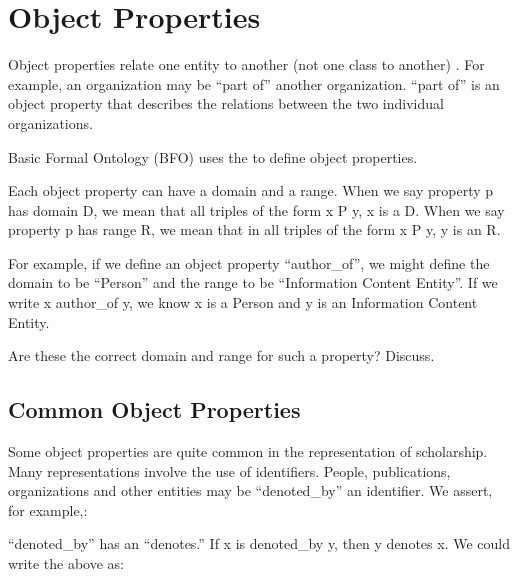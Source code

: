 \documentclass[letterpaper,10pt,english]{sphinxmanual}
\begin{document}
\chapter{Object Properties}
\label{\detokenize{object-properties:object-properties}}\label{\detokenize{object-properties::doc}}
\sphinxAtStartPar
Object properties relate one entity to another (not one class to another) .
For example, an organization may be
“part of” another organization.  “part of” is an object property that describes the
relations between the two individual organizations.

\sphinxAtStartPar
Basic Formal Ontology (BFO) uses the
 to define object
properties.

\sphinxAtStartPar
Each object property can have a domain and a range.  When we say property p has domain D,
we mean that all triples of the form x P y, x is a D.  When we say property p has range R,
we mean that in all triples of the form x P y, y is an R.

\sphinxAtStartPar
For example, if we define an object property “author\_of”, we might define the domain to
be “Person” and the range to be “Information Content Entity”. If we write x author\_of y,
we know x is a Person and y is an Information Content Entity. %
\begin{footnote}[1]\sphinxAtStartFootnote
Are these the correct domain and range for such a property? Discuss.
%
\end{footnote}


\section{Common Object Properties}
\label{\detokenize{object-properties:common-object-properties}}
\sphinxAtStartPar
Some object properties are quite common in the representation of scholarship.  Many
representations involve the use of identifiers.  People, publications, organizations
and other entities may be “denoted\_by” an identifier.  We assert, for example,:

\begin{sphinxVerbatim}[commandchars=\\\{\}]
  
  
  
\end{sphinxVerbatim}

\sphinxAtStartPar
“denoted\_by” has an  “denotes.”  If x is denoted\_by y, then y denotes x.
We could write the above as:
\end{document}
